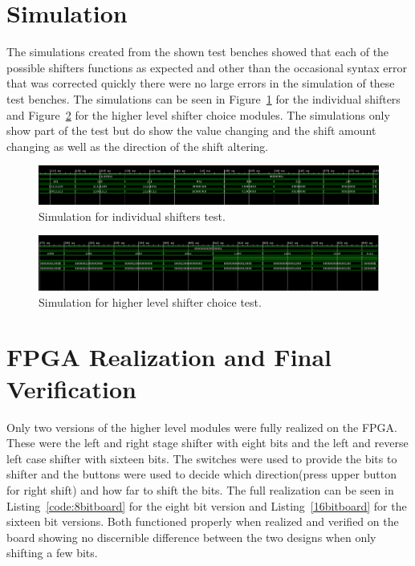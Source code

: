 \documentclass{article}\usepackage{graphicx} %
\begin{document}
\section{Simulation}
The simulations created from the shown test benches showed that each of the possible shifters functions as expected and other than the occasional syntax error that was corrected quickly there were no large errors in the simulation of these test benches. The simulations can be seen in Figure~\ref{fig:ShifterTestSim} for the individual shifters and Figure~\ref{fig:HigherTestSim} for the higher level shifter choice modules. The simulations only show part of the test but do show the value changing and the shift amount changing as well as the direction of the shift altering. 
\begin{figure}[H]
\begin{center}
	\caption{Simulation for individual shifters test.}\label{fig:ShifterTestSim}
	\includegraphics[width=1.5\textwidth]{../images/ShifterStageSim.png}
\end{center}
\end{figure}
\begin{figure}[H]
\begin{center}
	\caption{Simulation for higher level shifter choice test.}\label{fig:HigherTestSim}
	\includegraphics[width=1.5\textwidth]{../images/Shifters_16bit_sim.png}
\end{center}
\end{figure}
\section{FPGA Realization and Final Verification}
Only two versions of the higher level modules were fully realized on the FPGA. These were the left and right stage shifter with eight bits and the left and reverse left case shifter with sixteen bits. The switches were used to provide the bits to shifter and the buttons were used to decide which direction(press upper button for right shift) and how far to shift the bits. The full realization can be seen in Listing~\ref{code:8bitboard} for the eight bit version and Listing~\ref{16bitboard} for the sixteen bit versions. Both functioned properly when realized and verified on the board showing no discernible difference between the two designs when only shifting a few bits.
\end{document}
